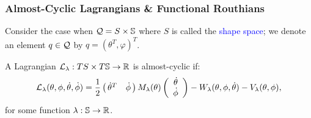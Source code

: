 \documentclass{beamer}
\begin{document}
\begin{frame}
  \frametitle{Almost-Cyclic Lagrangians \& Functional Routhians}
  \vspace{-1mm}

  Consider the case when $\mathcal{Q} = S \times \mathbb{S}$ where $S$ is called the \textcolor{blue}{shape space}; we denote an element $q \in \mathcal{Q}$ by $q = (\theta^T, \varphi)^T$.

  \vspace{-1mm}

  \begin{definition}
    A Lagrangian $\mathcal{L}_{\lambda} : TS \times T\mathbb{S} \to \mathbb{R}$ is \alert{almost-cyclic} if:
    \vspace{-3mm}
    \begin{align*}
      \mathcal{L}_{\lambda}(\theta, \phi, \dot \theta, \dot \phi)  =
      \frac{1}{2} \left(\!\!\begin{array}{cc}
      \dot \theta^T  &  \dot \phi
      \end{array}\!\!\right) M_{\lambda}(\theta)
      \left(\begin{array}{c}
        \dot \theta\\
        \dot \phi
      \end{array}\right) - W_{\lambda}(\theta, \phi, \dot \theta) - V_{\lambda}(\theta, \phi),
    \end{align*}
    for some function $\lambda : \mathbb{S} \to \mathbb{R}$.
  \end{definition}



\end{frame}
\end{document}
